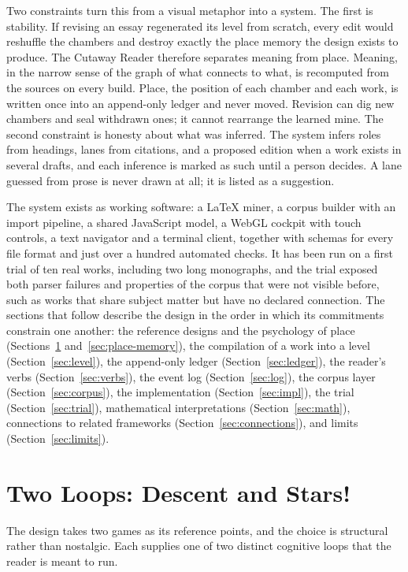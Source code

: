 \documentclass[11pt]{article}
\theoremstyle{remark}
\begin{document}
Two constraints turn this from a visual metaphor into a system. The first is stability. If revising an essay regenerated its level from scratch, every edit would reshuffle the chambers and destroy exactly the place memory the design exists to produce. The Cutaway Reader therefore separates meaning from place. Meaning, in the narrow sense of the graph of what connects to what, is recomputed from the sources on every build. Place, the position of each chamber and each work, is written once into an append-only ledger and never moved. Revision can dig new chambers and seal withdrawn ones; it cannot rearrange the learned mine. The second constraint is honesty about what was inferred. The system infers roles from headings, lanes from citations, and a proposed edition when a work exists in several drafts, and each inference is marked as such until a person decides. A lane guessed from prose is never drawn at all; it is listed as a suggestion.

The system exists as working software: a LaTeX miner, a corpus builder with an import pipeline, a shared JavaScript model, a WebGL cockpit with touch controls, a text navigator and a terminal client, together with schemas for every file format and just over a hundred automated checks. It has been run on a first trial of ten real works, including two long monographs, and the trial exposed both parser failures and properties of the corpus that were not visible before, such as works that share subject matter but have no declared connection. The sections that follow describe the design in the order in which its commitments constrain one another: the reference designs and the psychology of place (Sections~\ref{sec:loops} and~\ref{sec:place-memory}), the compilation of a work into a level (Section~\ref{sec:level}), the append-only ledger (Section~\ref{sec:ledger}), the reader's verbs (Section~\ref{sec:verbs}), the event log (Section~\ref{sec:log}), the corpus layer (Section~\ref{sec:corpus}), the implementation (Section~\ref{sec:impl}), the trial (Section~\ref{sec:trial}), mathematical interpretations (Section~\ref{sec:math}), connections to related frameworks (Section~\ref{sec:connections}), and limits (Section~\ref{sec:limits}).

\section{Two Loops: Descent and Stars!}
\label{sec:loops}

The design takes two games as its reference points, and the choice is structural rather than nostalgic. Each supplies one of two distinct cognitive loops that the reader is meant to run.
\end{document}
